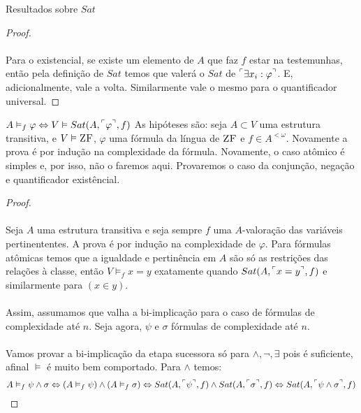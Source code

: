 \begin{lemma}{Resultados sobre $Sat$}
\begin{proof}
                \paragraph{}
                    Para o existencial, se existe um elemento de $A$ que faz $f$ estar na testemunhas, então pela definição de $Sat$
                    temos que valerá o $Sat$ de $\FMLA{\exists x_i:\varphi}$. E, adicionalmente, vale a volta. Similarmente vale o 
                    mesmo para o quantificador universal.
                    \eop
            \end{proof}
        \end{lemma}
        \begin{theorem}{$A\vDash_f\varphi \Leftrightarrow V\vDash Sat(A,{}^\ulcorner{\varphi}^\urcorner,f)$}
            As hipóteses são: seja $A\subset V$ uma estrutura transitiva, e 
            $V\vDash \text{\sc ZF}$, $\varphi$ uma fórmula da língua de $\text{\sc ZF}$ e $f\in A^{<\omega}$. 
            Novamente a prova é por indução na complexidade da 
            fórmula. Novamente, o caso atômico é simples e, por isso, não o 
            faremos aqui. Provaremos o caso da conjunção, negação e quantificador 
            existêncial.
            \begin{proof}
                \paragraph{}
                    Seja $A$ uma estrutura transitiva e seja sempre $f$ uma $A$-valoração 
                    das variáveis pertinententes. A prova é por indução na complexidade 
                    de $\varphi$. Para fórmulas atômicas temos que a igualdade e pertinência 
                    em $A$ são só as restrições das relações à classe, então $V\vDash_f x = y$ exatamente 
                    quando $Sat(A,\FMLA{x = y},f)$ e similarmente para $(x\in y)$.
                \paragraph{}
                    Assim, assumamos que valha a bi-implicação para o caso de fórmulas de complexidade 
                    até $n$. Seja agora, $\psi$ e $\sigma$ fórmulas de complexidade até $n$.
                \paragraph{}
                    Vamos provar a bi-implicação da etapa sucessora só para $\land,\neg,\exists$ pois 
                    é suficiente, afinal $\vDash$ é muito bem comportado. Para $\land$ temos:
                $$A\vDash_f\psi\land\sigma \BIM (A\vDash_f\psi)\land(A\vDash_f\sigma)\BIM Sat(A,\FMLA{\psi},f)\land Sat(A,\FMLA{\sigma},f)\BIM Sat(A,\FMLA{\psi\land\sigma},f)$$

\end{proof}
\end{theorem}
